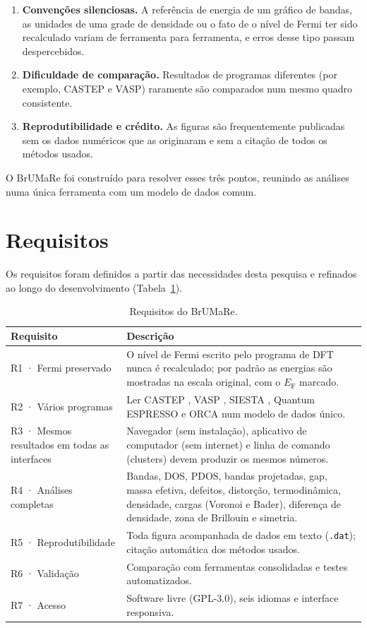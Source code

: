 \begin{enumerate}
\item \textbf{Convenções silenciosas.} A referência de energia de um gráfico de bandas, as unidades de uma grade de densidade ou o fato de o nível de Fermi ter sido recalculado variam de ferramenta para ferramenta, e erros desse tipo passam despercebidos.
\item \textbf{Dificuldade de comparação.} Resultados de programas diferentes (por exemplo, CASTEP e VASP) raramente são comparados num mesmo quadro consistente.
\item \textbf{Reprodutibilidade e crédito.} As figuras são frequentemente publicadas sem os dados numéricos que as originaram e sem a citação de todos os métodos usados.
\end{enumerate}

O \textsf{BrUMaRe} foi construído para resolver esses três pontos, reunindo as análises numa única ferramenta com um modelo de dados comum.

\section{Requisitos}

Os requisitos foram definidos a partir das necessidades desta pesquisa e refinados ao longo do desenvolvimento (Tabela~\ref{tab:requisitos}).

\begin{table}[htbp]\centering\small
\caption{Requisitos do BrUMaRe.}\label{tab:requisitos}
\begin{tabularx}{\linewidth}{@{}lX@{}}\toprule
Requisito & Descrição \\\midrule
R1 · Fermi preservado & O nível de Fermi escrito pelo programa de DFT nunca é recalculado; por padrão as energias são mostradas na escala original, com o $E_\mathrm{F}$ marcado. \\
R2 · Vários programas & Ler CASTEP \cite{clark2005castep}, VASP \cite{kresse1996vasp}, SIESTA \cite{soler2002siesta}, Quantum ESPRESSO \cite{giannozzi2017} e ORCA \cite{neese2020} num modelo de dados único. \\
R3 · Mesmos resultados em todas as interfaces & Navegador (sem instalação), aplicativo de computador (sem internet) e linha de comando (clusters) devem produzir os mesmos números. \\
R4 · Análises completas & Bandas, DOS, PDOS, bandas projetadas, gap, massa efetiva, defeitos, distorção, termodinâmica, densidade, cargas (Voronoi e Bader), diferença de densidade, zona de Brillouin e simetria. \\
R5 · Reprodutibilidade & Toda figura acompanhada de dados em texto (\texttt{.dat}); citação automática dos métodos usados. \\
R6 · Validação & Comparação com ferramentas consolidadas e testes automatizados. \\
R7 · Acesso & Software livre (GPL-3.0), seis idiomas e interface responsiva. \\\bottomrule
\end{tabularx}
\end{table}

